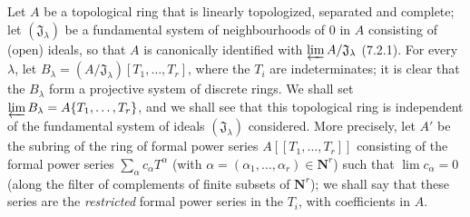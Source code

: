 \begin{env}[7.5.1]
\label{0.7.5.1}
Let $A$ be a topological ring that is linearly topologized, separated and complete;
let $(\mathfrak J_\lambda)$ be a fundamental system of neighbourhoods of $0$ in
$A$ consisting of (open) ideals, so that $A$ is canonically identified with
$\varprojlim A/\mathfrak J_\lambda$ (7.2.1). For every $\lambda$, let
$B_\lambda=(A/\mathfrak J_\lambda)[T_1,\ldots,T_r]$, where the $T_i$ are
indeterminates; it is clear that the $B_\lambda$ form a projective system
of discrete rings. We shall set
$\varprojlim B_\lambda=A\{T_1,\ldots,T_r\}$, and we shall see that this
topological ring is independent of the fundamental system of ideals
$(\mathfrak J_\lambda)$ considered. More precisely, let $A'$ be the subring
of the ring of formal power series $A[\![T_1,\ldots,T_r]\!]$ consisting of the formal
power series $\sum_\alpha c_\alpha T^\alpha$ (with
$\alpha=(\alpha_1,\ldots,\alpha_r)\in\mathbf{N}^r$) such that
$\lim c_\alpha=0$ (along the filter of complements of finite
subsets of $\mathbf{N}^r$); we shall say that these series are the
\emph{restricted} formal power series in the $T_i$, with coefficients in $A$.



\end{env}

